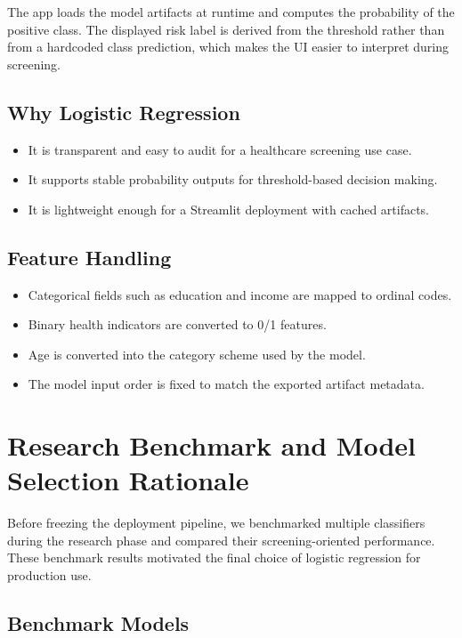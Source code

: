 \documentclass[12pt]{article}
\begin{document}
The app loads the model artifacts at runtime and computes the probability of the positive class. The displayed risk label is derived from the threshold rather than from a hardcoded class prediction, which makes the UI easier to interpret during screening.

\subsection*{Why Logistic Regression}

\begin{itemize}
\item It is transparent and easy to audit for a healthcare screening use case.
\item It supports stable probability outputs for threshold-based decision making.
\item It is lightweight enough for a Streamlit deployment with cached artifacts.
\end{itemize}

\subsection*{Feature Handling}

\begin{itemize}
\item Categorical fields such as education and income are mapped to ordinal codes.
\item Binary health indicators are converted to 0/1 features.
\item Age is converted into the category scheme used by the model.
\item The model input order is fixed to match the exported artifact metadata.
\end{itemize}

\section{Research Benchmark and Model Selection Rationale}

Before freezing the deployment pipeline, we benchmarked multiple classifiers during the research phase and compared their screening-oriented performance. These benchmark results motivated the final choice of logistic regression for production use.

\subsection*{Benchmark Models}
\end{document}
